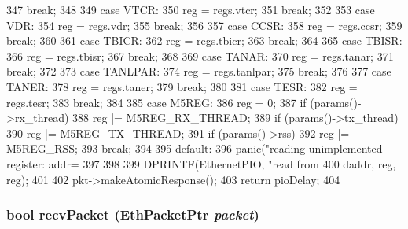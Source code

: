 \begin{DoxyCode}
{{347             break;
348 
349           case VTCR:
350             reg = regs.vtcr;
351             break;
352 
353           case VDR:
354             reg = regs.vdr;
355             break;
356 
357           case CCSR:
358             reg = regs.ccsr;
359             break;
360 
361           case TBICR:
362             reg = regs.tbicr;
363             break;
364 
365           case TBISR:
366             reg = regs.tbisr;
367             break;
368 
369           case TANAR:
370             reg = regs.tanar;
371             break;
372 
373           case TANLPAR:
374             reg = regs.tanlpar;
375             break;
376 
377           case TANER:
378             reg = regs.taner;
379             break;
380 
381           case TESR:
382             reg = regs.tesr;
383             break;
384 
385           case M5REG:
386             reg = 0;
387             if (params()->rx_thread)
388                 reg |= M5REG_RX_THREAD;
389             if (params()->tx_thread)
390                 reg |= M5REG_TX_THREAD;
391             if (params()->rss)
392                 reg |= M5REG_RSS;
393             break;
394 
395           default:
396             panic("reading unimplemented register: addr=%
397         }
398 
399         DPRINTF(EthernetPIO, "read from %
400                 daddr, reg, reg);
401 
402     pkt->makeAtomicResponse();
403     return pioDelay;
404 }
\end{DoxyCode}
\hypertarget{classNSGigE_ad54e71348f53dfb5444979e9bfaf3164}{
\subsubsection[{recvPacket}]{\setlength{\rightskip}{0pt plus 5cm}bool recvPacket ({\bf EthPacketPtr} {\em packet})}}
\label{classNSGigE_ad54e71348f53dfb5444979e9bfaf3164}



